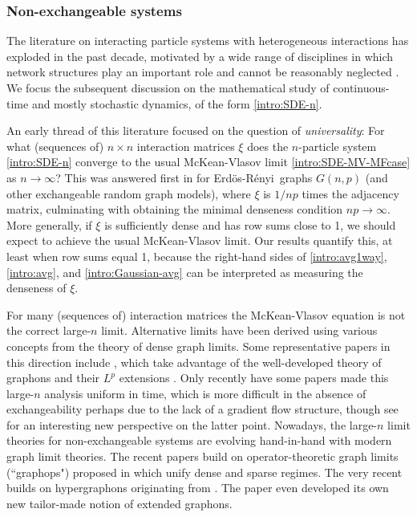 \documentclass[11pt,reqno]{amsart}
\numberwithin{equation}{section}
\theoremstyle{definition}
\newcommand{\Erdos}{Erd\"{o}s-R\'enyi}
\begin{document}
\subsubsection{Non-exchangeable systems}

The literature on interacting particle systems with heterogeneous interactions has exploded in the past decade, motivated by a wide range of disciplines in which network structures play an important role and cannot be reasonably neglected \cite{newman2018networks}. We focus the subsequent discussion on the mathematical study of continuous-time and mostly stochastic dynamics, of the form \eqref{intro:SDE-n}.


An early thread of this literature focused on the question of \emph{universality}: For what (sequences of) $n \times n$ interaction matrices $\xi$ does the $n$-particle system \eqref{intro:SDE-n} converge to the usual McKean-Vlasov limit \eqref{intro:SDE-MV-MFcase} as $n\to\infty$? This was answered first in \cite{bhamidi2019weakly,delattre2016note,coppini2020law} for \Erdos\ graphs $G(n,p)$ (and other exchangeable random graph models), where $\xi$ is $1/np$ times the adjacency matrix, culminating with \cite{oliveira2019interacting} obtaining the minimal denseness condition $np \to \infty$.
More generally, if $\xi$ is sufficiently dense and has row sums close  to 1, we should expect to achieve the usual McKean-Vlasov limit. Our results quantify this,   at least when row sums equal 1, because the right-hand sides of \eqref{intro:avg1way}, \eqref{intro:avg}, and \eqref{intro:Gaussian-avg} can be interpreted as measuring the denseness of $\xi$. 


For many (sequences of) interaction matrices the McKean-Vlasov equation is not the correct large-$n$ limit. Alternative limits have been derived using various concepts from the theory of dense graph limits. Some representative papers in this direction include  \cite{medvedev2014nonlinear,chiba2016mean,medvedev2018continuum,bayraktar2023graphon,bet2024weakly}, which take advantage of the well-developed theory of  graphons  \cite{lovasz2012large} and their $L^p$ extensions \cite{borgs2019I,borgs2019II}.
Only recently have some papers \cite{bayraktar2022stationarity,bris2022note} made this large-$n$ analysis uniform in time, which is more difficult in the absence of exchangeability perhaps due to the lack of a gradient flow structure, though see \cite{peszek2023heterogeneous} for an interesting new perspective on the latter point.
Nowadays, the large-$n$ limit theories for non-exchangeable systems are evolving hand-in-hand with modern graph limit theories. The recent papers  \cite{kuehn2022vlasov,gkogkas2022graphop} build on operator-theoretic graph limits (``graphops") proposed in \cite{backhausz2022action} which unify dense and sparse regimes. The very recent \cite{ayi2024mean} builds on hypergraphons originating from \cite{elek2012measure}. The paper \cite{jabin2021mean} even developed its own new tailor-made notion of extended graphons.
\end{document}
